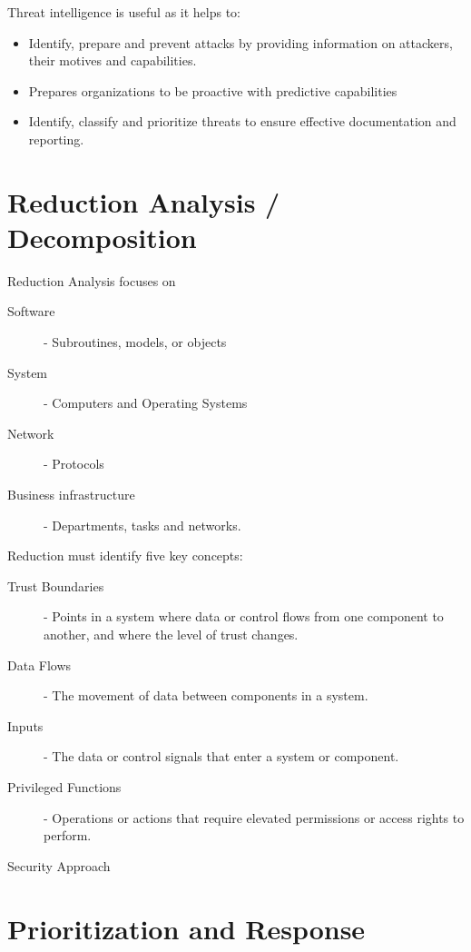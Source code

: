 \documentclass[12pt letter]{report}
\begin{document}
Threat intelligence is useful as it helps to:
\begin{itemize}
  \item Identify, prepare and prevent attacks by providing
    information on attackers, their motives and capabilities.
  \item Prepares organizations to be proactive with predictive capabilities
  \item Identify, classify and prioritize threats to ensure effective
    documentation and reporting.
\end{itemize}

\section{Reduction Analysis / Decomposition}


Reduction Analysis focuses on
\begin{description}
  \item[Software] - Subroutines, models, or objects
  \item[System] - Computers and Operating Systems
  \item[Network] - Protocols
  \item[Business infrastructure] - Departments, tasks and networks.
\end{description}

Reduction must identify five key concepts:
\begin{description}
  \item[Trust Boundaries] - Points in a system where data or control
    flows from one component to another, and where the level of trust
    changes.
  \item[Data Flows] - The movement of data between components in a system.
  \item[Inputs] - The data or control signals that enter a system or component.
  \item[Privileged Functions] - Operations or actions that require elevated
    permissions or access rights to perform.
  \item[Security Approach]
\end{description}

\section{Prioritization and Response}
\end{document}

